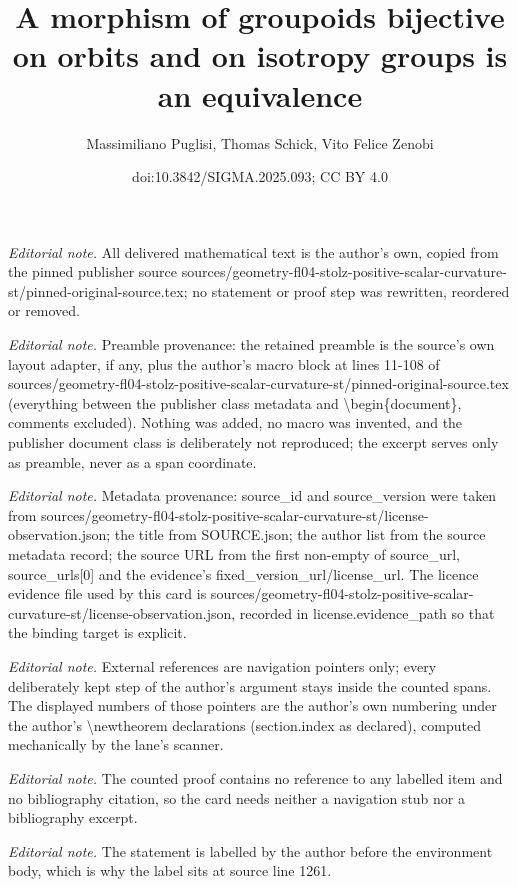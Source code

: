 \documentclass[10pt,a4paper]{amsart}
\title{A morphism of groupoids bijective on orbits and on isotropy groups is an equivalence}
\author{Massimiliano Puglisi, Thomas Schick, Vito Felice Zenobi}
\date{doi:10.3842/SIGMA.2025.093; CC BY 4.0}
\begin{document}
\maketitle
\noindent\textit{Editorial note.} All delivered mathematical text is the author's own, copied from the pinned publisher source sources/geometry-fl04-stolz-positive-scalar-curvature-st/pinned-original-source.tex; no statement or proof step was rewritten, reordered or removed.\par\medskip
\noindent\textit{Editorial note.} Preamble provenance: the retained preamble is the source's own layout adapter, if any, plus the author's macro block at lines 11-108 of sources/geometry-fl04-stolz-positive-scalar-curvature-st/pinned-original-source.tex (everything between the publisher class metadata and \textbackslash{}begin\{document\}, comments excluded). Nothing was added, no macro was invented, and the publisher document class is deliberately not reproduced; the excerpt serves only as preamble, never as a span coordinate.\par\medskip
\noindent\textit{Editorial note.} Metadata provenance: source\_id and source\_version were taken from sources/geometry-fl04-stolz-positive-scalar-curvature-st/license-observation.json; the title from SOURCE.json; the author list from the source metadata record; the source URL from the first non-empty of source\_url, source\_urls[0] and the evidence's fixed\_version\_url/license\_url. The licence evidence file used by this card is sources/geometry-fl04-stolz-positive-scalar-curvature-st/license-observation.json, recorded in license.evidence\_path so that the binding target is explicit.\par\medskip
\noindent\textit{Editorial note.} External references are navigation pointers only; every deliberately kept step of the author's argument stays inside the counted spans. The displayed numbers of those pointers are the author's own numbering under the author's \textbackslash{}newtheorem declarations (section.index as declared), computed mechanically by the lane's scanner.\par\medskip
\noindent\textit{Editorial note.} The counted proof contains no reference to any labelled item and no bibliography citation, so the card needs neither a navigation stub nor a bibliography excerpt.\par\medskip
\noindent\textit{Editorial note.} The statement is labelled by the author before the environment body, which is why the label sits at source line 1261.\par\medskip
\end{document}
